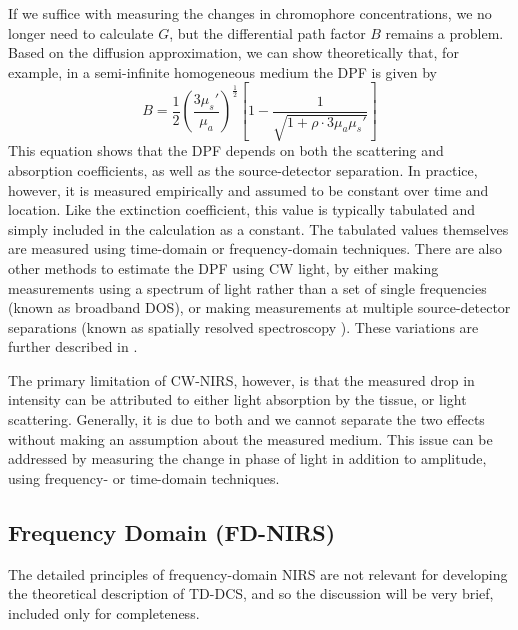If we suffice with measuring the changes in chromophore concentrations, we no longer need to calculate $G$, but the differential path factor $B$ remains a problem. Based on the diffusion approximation, we can show theoretically that, for example, in a semi-infinite homogeneous medium the DPF is given by \cite{Scholkmann2013}
\begin{equation}
B = \frac{1}{2}\left( \frac{3\mu_s'}{\mu_a} \right)^{\frac{1}{2}}\left[1-\frac{1}{\sqrt{1+\rho\cdot 3\mu_a\mu_s'}}\right]
\end{equation}
This equation shows that the DPF depends on both the scattering and absorption coefficients, as well as the source-detector separation. In practice, however, it is measured empirically and assumed to be constant over time and location. Like the extinction coefficient, this value is typically tabulated and simply included in the calculation as a constant. The tabulated values themselves are measured using time-domain \cite{Chance1988, Delpy1988} or frequency-domain \cite{Franceschini1999} techniques. There are also other methods to estimate the DPF using CW light, by either making measurements using a spectrum of light rather than a set of single frequencies (known as broadband DOS), or making measurements at multiple source-detector separations (known as spatially resolved spectroscopy \cite[ch. 2.4.2]{Madsen2013}). These variations are further described in \cite{Delpy1997}. 

The primary limitation of CW-NIRS, however, is that the measured drop in intensity can be attributed to either light absorption by the tissue, or light scattering. Generally, it is due to both and we cannot separate the two effects without making an assumption about the measured medium. This issue can be addressed by measuring the change in phase of light in addition to amplitude, using frequency- or time-domain techniques. 

\subsection{Frequency Domain (FD-NIRS)}
The detailed principles of frequency-domain NIRS are not relevant for developing the theoretical description of TD-DCS, and so the discussion will be very brief, included only for completeness.

